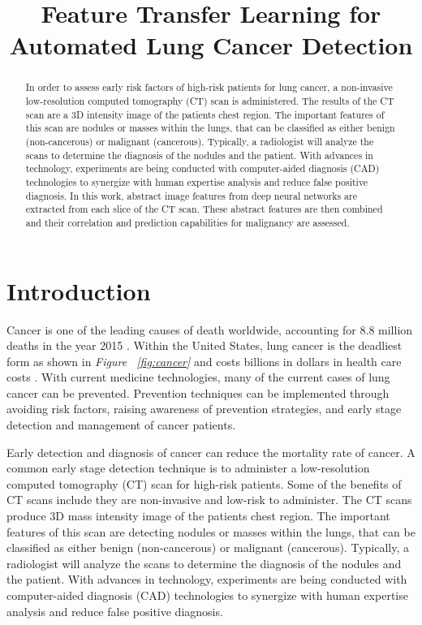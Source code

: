 \documentclass[conference,11pt]{IEEEtran}
\title{Feature Transfer Learning for Automated Lung Cancer Detection}
\author{
    \IEEEauthorblockN{Benjamin Hillmann}
    \IEEEauthorblockA{
        \today
    }
}
\begin{document}
\onecolumn
\maketitle

\begin{abstract}
In order to assess early risk factors of high-risk patients for lung cancer, a non-invasive low-resolution computed tomography (CT) scan is administered. The results of the CT scan are a 3D intensity image of the patients chest region. The important features of this scan are nodules or masses within the lungs, that can be classified as either benign (non-cancerous) or malignant (cancerous). Typically, a radiologist will analyze the scans to determine the diagnosis of the nodules and the patient. With advances in technology, experiments are being conducted with computer-aided diagnosis (CAD) technologies to synergize with human expertise analysis and reduce false positive diagnosis. In this work, abstract image features from deep neural networks are extracted from each slice of the CT scan. These abstract features are then combined and their correlation and prediction capabilities for malignancy are assessed.
\end{abstract}

\section{Introduction}

Cancer is one of the leading causes of death worldwide, accounting for 8.8 million deaths in the year 2015 \cite{noauthor_who_nodate}. Within the United States, lung cancer is the deadliest form as shown in \textit{Figure ~\ref{fig:cancer}} and costs billions in dollars in health care costs \cite{noauthor_united_nodate}. With current medicine technologies, many of the current cases of lung cancer can be prevented. Prevention techniques can be implemented through avoiding risk factors, raising awareness of prevention strategies, and early stage detection and management of cancer patients.

Early detection and diagnosis of cancer can reduce the mortality rate of cancer. A common early stage detection technique is to administer a low-resolution computed tomography (CT) scan for high-risk patients. Some of the benefits of CT scans include they are non-invasive and low-risk to administer. The CT scans produce 3D mass intensity image of the patients chest region. The important features of this scan are detecting nodules or masses within the lungs, that can be classified as either benign (non-cancerous) or malignant (cancerous). Typically, a radiologist will analyze the scans to determine the diagnosis of the nodules and the patient. With advances in technology, experiments are being conducted with computer-aided diagnosis (CAD) technologies to synergize with human expertise analysis and reduce false positive diagnosis.
\end{document}
